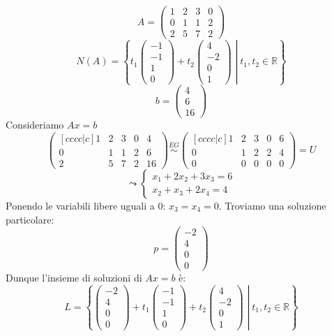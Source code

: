 \documentclass[a4paper]{article}
\theoremstyle{break}
\theoremstyle{break}
\theoremstyle{break}
\theoremstyle{break}
\begin{document}
\begin{example}
  \[
  A = \begin{pmatrix} 
    1 & 2 & 3 & 0\\
    0 & 1 & 1 & 2\\
    2 & 5 & 7 & 2
  \end{pmatrix} 
  \] 
  \[
  N(A) = \left\{ \left. t_1 \begin{pmatrix} -1\\-1\\1\\0 \end{pmatrix} +
    t_2 \begin{pmatrix} 4\\-2\\0\\1 \end{pmatrix} \; \right| \;
    t_1,t_2 \in \mathbb{R}
  \right\} 
  \] 
  \[
  b = \begin{pmatrix} 4\\6\\16 \end{pmatrix} 
  \] 
  Consideriamo \( Ax = b \) 
  \[
  \begin{pmatrix}[cccc|c]
    1 & 2 & 3 & 0 & 4\\
    0 & 1 & 1 & 2 & 6\\
    2 & 5 & 7 & 2 & 16
  \end{pmatrix} 
  \stackrel{EG}{\sim}
  \begin{pmatrix}[cccc|c]
    1 & 2 & 3 & 0 & 6\\
    0 & 1 & 2 & 2 & 4\\
    0 & 0 & 0 & 0 & 0
  \end{pmatrix} 
  = U
  \] 
  \[
  \leadsto \begin{cases}
    x_1 + 2x_2 + 3x_3 = 6\\
    x_2 + x_3 + 2x_4 = 4
  \end{cases}
  \] 
  Ponendo le variabili libere uguali a 0: \( x_3 = x_4 = 0 \). Troviamo una soluzione
  particolare:
  \[
  p = \begin{pmatrix} 
    -2\\4\\0\\0
  \end{pmatrix} 
  \] 
  Dunque l'insieme di soluzioni di \( Ax = b \) è:
  \[
  L = \left\{\left. \begin{pmatrix} 
      -2\\4\\0\\0
  \end{pmatrix} + t_1 \begin{pmatrix} -1\\-1\\1\\0 \end{pmatrix} +
  t_2 \begin{pmatrix} 4\\-2\\0\\1 \end{pmatrix} \; \right|\; t_1,t_2 \in \mathbb{R} \right\}
  \] 
\end{example}
\end{document}
